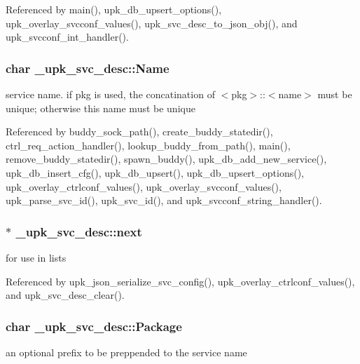 Referenced by main(), upk\_\-db\_\-upsert\_\-options(), upk\_\-overlay\_\-svcconf\_\-values(), upk\_\-svc\_\-desc\_\-to\_\-json\_\-obj(), and upk\_\-svcconf\_\-int\_\-handler().

\subsubsection[{Name}]{\setlength{\rightskip}{0pt plus 5cm}char {\bf \_\-upk\_\-svc\_\-desc::Name}}\label{struct__upk__svc__desc_a7a769827b6422551922ac2f8e5e61564}
service name. if pkg is used, the concatination of $<$pkg$>$::$<$name$>$ must be unique; otherwise this name must be unique 

Referenced by buddy\_\-sock\_\-path(), create\_\-buddy\_\-statedir(), ctrl\_\-req\_\-action\_\-handler(), lookup\_\-buddy\_\-from\_\-path(), main(), remove\_\-buddy\_\-statedir(), spawn\_\-buddy(), upk\_\-db\_\-add\_\-new\_\-service(), upk\_\-db\_\-insert\_\-cfg(), upk\_\-db\_\-upsert(), upk\_\-db\_\-upsert\_\-options(), upk\_\-overlay\_\-ctrlconf\_\-values(), upk\_\-overlay\_\-svcconf\_\-values(), upk\_\-parse\_\-svc\_\-id(), upk\_\-svc\_\-id(), and upk\_\-svcconf\_\-string\_\-handler().

\subsubsection[{next}]{ $\ast$ {\bf \_\-upk\_\-svc\_\-desc::next}}\label{struct__upk__svc__desc_a31fedb1a34746057adad52eb06d14d6b}
for use in lists 

Referenced by upk\_\-json\_\-serialize\_\-svc\_\-config(), upk\_\-overlay\_\-ctrlconf\_\-values(), and upk\_\-svc\_\-desc\_\-clear().

\subsubsection[{Package}]{\setlength{\rightskip}{0pt plus 5cm}char {\bf \_\-upk\_\-svc\_\-desc::Package}}\label{struct__upk__svc__desc_a219ae29a1ebf4a2bf6c1451c9855a85b}
an optional prefix to be preppended to the service name 

